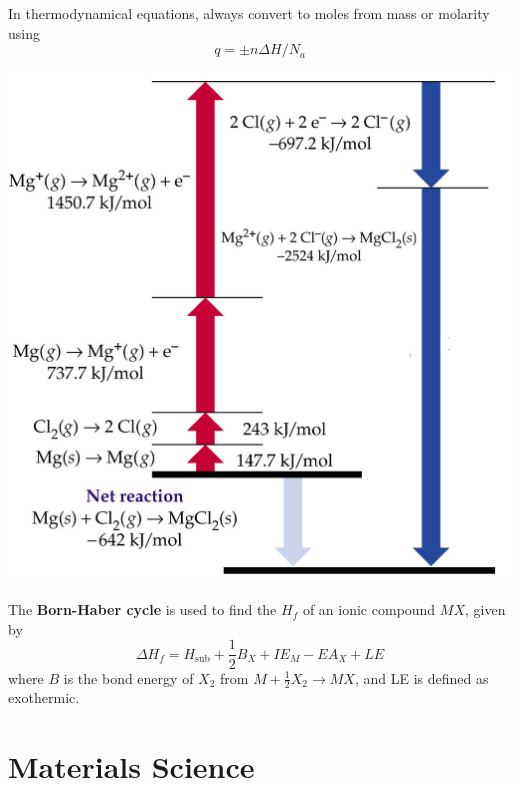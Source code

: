 \documentclass{tufte-book}
\renewcommand{\emph}[1]{\textbf{#1}}
\begin{document}
In thermodynamical equations, always convert to moles from mass or molarity using \begin{equation}
  q = \pm n \Delta H / N_a
\end{equation}
%
\begin{marginfigure}[-50mm]
\begin{center}
  \includegraphics[width=\textwidth]{bornhaber}
\end{center}
\end{marginfigure}
%
The \emph{Born-Haber cycle} is used to find the $H_f$ of an ionic compound $MX$, given by \begin{equation}
  \Delta H_f = H_{\text{sub}} + \textstyle{\frac{1}{2}} B_X + IE_M - EA_X + LE
\end{equation}
where $B$ is the bond energy of $X_2$ from $M + \frac{1}{2} X_2 \to MX$, and LE is defined as exothermic.


\chapter{Materials Science}
\end{document}
